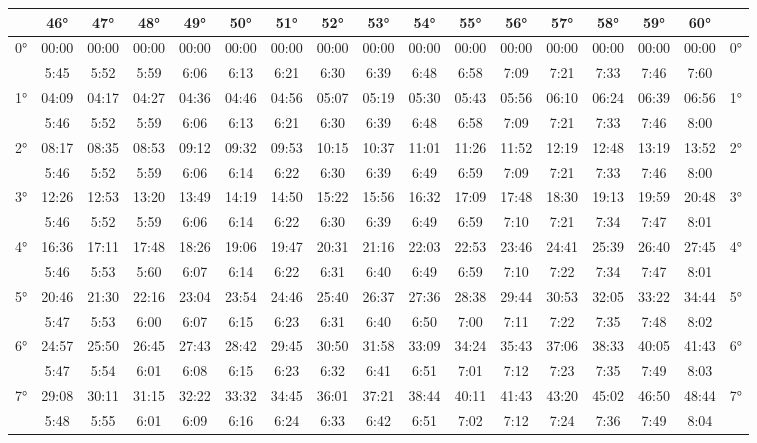 \begin{scriptsize}\begin{tabular}{c || c | c | c | c | c | c | c | c | c | c | c | c | c | c | c || c}
		\space &46°&47°&48°&49°&50°&51°&52°&53°&54°&55°&56°&57°&58°&59°&60°\\\hline\hline
		\multirow{2}{*}{0°}&00:00&00:00&00:00&00:00&00:00&00:00&00:00&00:00&00:00&00:00&00:00&00:00&00:00&00:00&00:00&\multirow{2}{*}{0°}\\ \space&5:45&5:52&5:59&6:06&6:13&6:21&6:30&6:39&6:48&6:58&7:09&7:21&7:33&7:46&7:60&\space\\\hline
		\multirow{2}{*}{1°}&04:09&04:17&04:27&04:36&04:46&04:56&05:07&05:19&05:30&05:43&05:56&06:10&06:24&06:39&06:56&\multirow{2}{*}{1°}\\ \space&5:46&5:52&5:59&6:06&6:13&6:21&6:30&6:39&6:48&6:58&7:09&7:21&7:33&7:46&8:00&\space\\\hline
		\multirow{2}{*}{2°}&08:17&08:35&08:53&09:12&09:32&09:53&10:15&10:37&11:01&11:26&11:52&12:19&12:48&13:19&13:52&\multirow{2}{*}{2°}\\ \space&5:46&5:52&5:59&6:06&6:14&6:22&6:30&6:39&6:49&6:59&7:09&7:21&7:33&7:46&8:00&\space\\\hline
		\multirow{2}{*}{3°}&12:26&12:53&13:20&13:49&14:19&14:50&15:22&15:56&16:32&17:09&17:48&18:30&19:13&19:59&20:48&\multirow{2}{*}{3°}\\ \space&5:46&5:52&5:59&6:06&6:14&6:22&6:30&6:39&6:49&6:59&7:10&7:21&7:34&7:47&8:01&\space\\\hline
		\multirow{2}{*}{4°}&16:36&17:11&17:48&18:26&19:06&19:47&20:31&21:16&22:03&22:53&23:46&24:41&25:39&26:40&27:45&\multirow{2}{*}{4°}\\ \space&5:46&5:53&5:60&6:07&6:14&6:22&6:31&6:40&6:49&6:59&7:10&7:22&7:34&7:47&8:01&\space\\\hline
		\multirow{2}{*}{5°}&20:46&21:30&22:16&23:04&23:54&24:46&25:40&26:37&27:36&28:38&29:44&30:53&32:05&33:22&34:44&\multirow{2}{*}{5°}\\ \space&5:47&5:53&6:00&6:07&6:15&6:23&6:31&6:40&6:50&7:00&7:11&7:22&7:35&7:48&8:02&\space\\\hline
		\multirow{2}{*}{6°}&24:57&25:50&26:45&27:43&28:42&29:45&30:50&31:58&33:09&34:24&35:43&37:06&38:33&40:05&41:43&\multirow{2}{*}{6°}\\ \space&5:47&5:54&6:01&6:08&6:15&6:23&6:32&6:41&6:51&7:01&7:12&7:23&7:35&7:49&8:03&\space\\\hline
		\multirow{2}{*}{7°}&29:08&30:11&31:15&32:22&33:32&34:45&36:01&37:21&38:44&40:11&41:43&43:20&45:02&46:50&48:44&\multirow{2}{*}{7°}\\ \space&5:48&5:55&6:01&6:09&6:16&6:24&6:33&6:42&6:51&7:02&7:12&7:24&7:36&7:49&8:04&\space\\\hline

\end{tabular}
\end{scriptsize}

